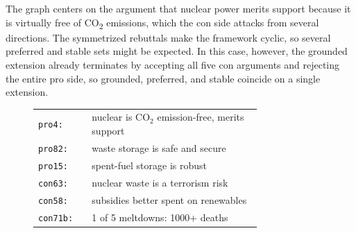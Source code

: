The graph centers on the argument that nuclear power merits support because it
is virtually free of CO\textsubscript{2} emissions, which the con side attacks
from several directions. The symmetrized rebuttals make the framework cyclic, so several preferred
and stable sets might be expected. In this case, however, the
grounded extension already terminates by accepting all five con arguments and
rejecting the entire pro side, so grounded, preferred, and stable coincide on a
single extension.

\begin{figure}[tb]
  \centering
  \begin{minipage}[c]{0.50\linewidth}
    \centering
  \end{minipage}\hfill
  \begin{minipage}[c]{0.48\linewidth}
    \scriptsize
    \begin{tabular}{@{}l@{\ }p{0.76\linewidth}@{}}
      \texttt{pro4:}   & nuclear is $\text{CO}_2$ emission-free, merits support \\
      \texttt{pro82:}  & waste storage is safe and secure \\
      \texttt{pro15:}  & spent-fuel storage is robust \\
      \texttt{con63:}  & nuclear waste is a terrorism risk \\
      \texttt{con58:}  & subsidies better spent on renewables \\
      \texttt{con71b:} & 1 of 5 meltdowns: 1000+ deaths \\

\end{tabular}
\end{minipage}
\end{figure}
